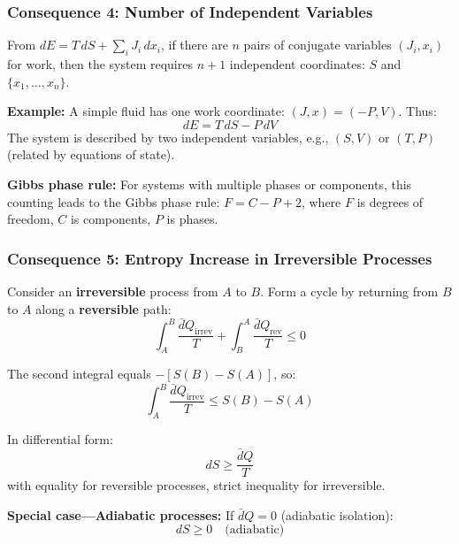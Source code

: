 \documentclass[9pt,twocoloumn]{article}
\begin{document}
\subsubsection{Consequence 4: Number of Independent Variables}

From $dE = T \, dS + \sum_i J_i \, dx_i$, if there are $n$ pairs of conjugate variables $(J_i, x_i)$ for work, then the system requires $n+1$ independent coordinates: $S$ and $\{x_1, \ldots, x_n\}$.

\textbf{Example:} A simple fluid has one work coordinate: $(J, x) = (-P, V)$. Thus:
\begin{equation}
dE = T \, dS - P \, dV
\end{equation}
The system is described by two independent variables, e.g., $(S, V)$ or $(T, P)$ (related by equations of state).

\textbf{Gibbs phase rule:} For systems with multiple phases or components, this counting leads to the Gibbs phase rule: $F = C - P + 2$, where $F$ is degrees of freedom, $C$ is components, $P$ is phases.

\subsubsection{Consequence 5: Entropy Increase in Irreversible Processes}

Consider an \textbf{irreversible} process from $A$ to $B$. Form a cycle by returning from $B$ to $A$ along a \textbf{reversible} path:
\begin{equation}
\int_A^B \frac{\bar{d}Q_{\text{irrev}}}{T} + \int_B^A \frac{\bar{d}Q_{\text{rev}}}{T} \leq 0
\end{equation}

The second integral equals $-[S(B) - S(A)]$, so:
\begin{equation}
\int_A^B \frac{\bar{d}Q_{\text{irrev}}}{T} \leq S(B) - S(A)
\end{equation}

In differential form:
\begin{equation}
\boxed{dS \geq \frac{\bar{d}Q}{T}}
\end{equation}
with equality for reversible processes, strict inequality for irreversible.

\textbf{Special case—Adiabatic processes:} If $\bar{d}Q = 0$ (adiabatic isolation):
\begin{equation}
\boxed{dS \geq 0 \quad \text{(adiabatic)}}
\end{equation}
\end{document}
